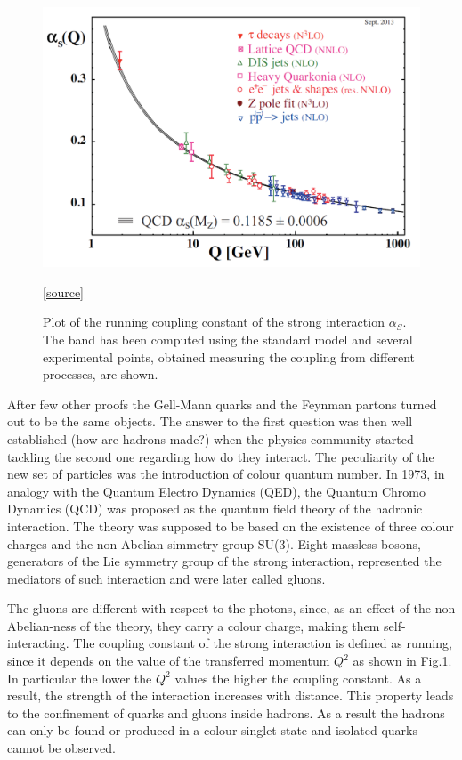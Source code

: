 \begin{figure}[!t]
\begin{center}
\includegraphics[width=0.85\linewidth]{Chapters/Introduction/Figs/QCD-running-coupling.pdf}
\caption{Plot of the running coupling constant of the strong interaction $\alpha_S$. The band has been computed using the standard model and several experimental points, obtained measuring the coupling from different processes, are shown.}
\href{https://www2.physics.ox.ac.uk/sites/default/files/2014-03-31/qcdgrad_rojo_oxford_tt14_3_rge_pdf_19828.pdf}{[source]}
\label{fig:running}
\end{center}
\end{figure}

After few other proofs the Gell-Mann quarks and the Feynman partons turned out to be the same objects.
The answer to the first question was then well established (how are hadrons made?) when the physics community started tackling the second one regarding how do they interact.
The peculiarity of the new set of particles was the introduction of colour quantum number.
In 1973, in analogy with the Quantum Electro Dynamics (QED), the Quantum Chromo Dynamics (QCD) was proposed as the quantum field theory of the hadronic interaction.
The theory was supposed to be based on the existence of three colour charges and the non-Abelian simmetry group SU(3).
Eight massless bosons, generators of the Lie symmetry group of the strong interaction, represented the mediators of such interaction and were later called gluons.

The gluons are different with respect to the photons, since, as an effect of the non Abelian-ness of the theory, they carry a colour charge, making them self-interacting.
The coupling constant of the strong interaction is defined as running, since it depends on the value of the transferred momentum $Q^2$ as shown in Fig.\ref{fig:running}.
In particular the lower the $Q^2$ values the higher the coupling constant.
As a result, the strength of the interaction increases with distance.
This property leads to the confinement of quarks and gluons inside hadrons.
As a result the hadrons can only be found or produced in a colour singlet state and isolated quarks cannot be observed.

